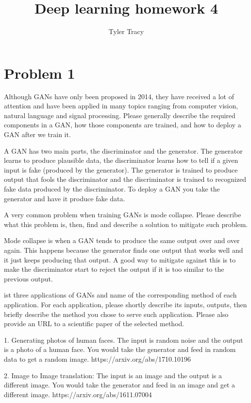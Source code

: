 \documentclass[12pt]{article}
\title{Deep learning homework 4}
\author{Tyler Tracy}
\begin{document}
\maketitle


\section*{Problem 1}

Although GANs have only been proposed in 2014, they have received a lot of attention and have been applied in many topics ranging from computer vision, natural language and signal processing. Please generally describe the required components in a GAN, how those components are trained, and how to deploy a GAN after we train it.

A GAN has two main parts, the discriminator and the generator. The generator learns to produce plausible data, the discriminator learns how to tell if a given input is fake (produced by the generator). The generator is trained to produce output that fools the discriminator and the discriminator is trained to recognized fake data produced by the discriminator. To deploy a GAN you take the generator and have it produce fake data.


A very common problem when training GANs is mode collapse. Please describe what this problem is, then, find and describe a solution to mitigate such problem.

Mode collapse is when a GAN tends to produce the same output over and over again. This happens because the generator finds one output that works well and it just keeps producing that output. A good way to mitigate against this is to make the discriminator start to reject the output if it is too similar to the previous output.

ist three applications of GANs and name of the corresponding method of each application.  For each application, please shortly describe its inputs, outputs, then briefly describe the method you chose to serve such application. Please also provide an URL to a scientific paper of the selected method.

1. Generating photos of human faces. The input is random noise and the output is a photo of a human face. You would take the generator and feed in random data to get a random image. https://arxiv.org/abs/1710.10196

2. Image to Image translation: The input is an image and the output is a different image. You would take the generator and feed in an image and get a different image. https://arxiv.org/abs/1611.07004
\end{document}
